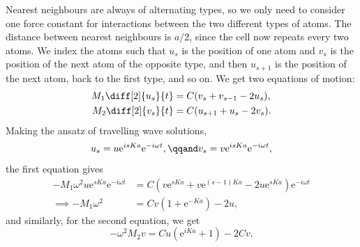 \documentclass[fleqn]{NotesClass}
\newcommand*{\e}{\mathrm{e}}
\begin{document}
    Nearest neighbours are always of alternating types, so we only need to consider one force constant for interactions between the two different types of atoms.
    The distance between nearest neighbours is \(a/2\), since the cell now repeats every two atoms.
    We index the atoms such that \(u_s\) is the position of one atom and \(v_s\) is the position of the next atom of the opposite type, and then \(u_{s+1}\) is the position of the next atom, back to the first type, and so on.
    We get two equations of motion:
    \begin{align}
        M_1 \diff[2]{u_s}{t} &= C(v_s + v_{s-1} - 2u_s),\\
        M_2 \diff[2]{v_s}{t} &= C(u_{s+1} + u_s - 2v_s).
    \end{align}
    Making the ansatz of travelling wave solutions,
    \begin{equation}
        u_s = u\e^{isKa}\e^{-i\omega t}, \qqand v_s = v\e^{isKa}\e^{-i\omega t},
    \end{equation}
    the first equation gives
    \begin{align}
        -M_1\omega^2u\e^{sKa}\e^{-i\omega t} &= C(v\e^{sKa} + v\e^{(s-1)Ka} - 2u\e^{sKa})\e^{-i\omega t}\\
        \implies -M_1\omega^2 &= Cv(1 + \e^{-Ka}) - 2u,
    \end{align}
    and similarly, for the second equation, we get
    \begin{equation}
        -\omega^2M_2v = Cu(\e^{iKa} + 1) - 2Cv.
    \end{equation}
    
\end{document}
